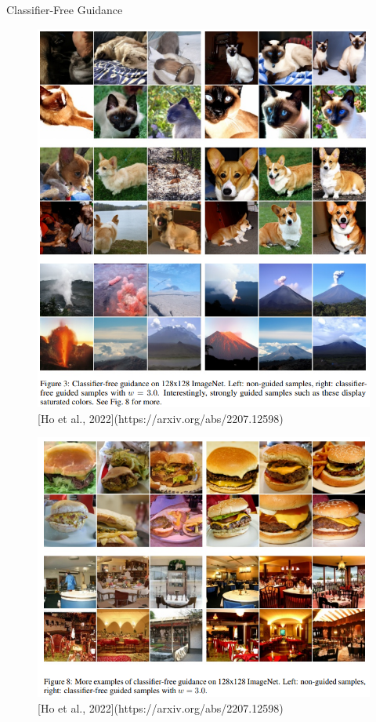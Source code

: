 \begin{frame}[allowframebreaks]{Classifier-Free Guidance}
    \framebreak

    \begin{figure}
        \centering
        \includegraphics[width=\linewidth,height=0.9\textheight,keepaspectratio]{images/adv-img-gen/classifier-free-guidance-5.png}
        \caption*{[Ho et al., 2022](https://arxiv.org/abs/2207.12598)}
    \end{figure}

    \framebreak

    \begin{figure}
        \centering
        \includegraphics[width=\linewidth,height=0.85\textheight,keepaspectratio]{images/adv-img-gen/classifier-free-guidance-6.png}
        \caption*{[Ho et al., 2022](https://arxiv.org/abs/2207.12598)}
    \end{figure}
\end{frame}